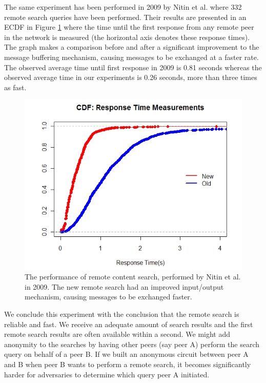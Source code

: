 \noindent The same experiment has been performed in 2009 by Nitin et al. where 332 remote search queries have been performed. Their results are presented in an ECDF in Figure \ref{fig:nitin_remote_search} where the time until the first response from any remote peer in the network is measured (the horizontal axis denotes these response times). The graph makes a comparison before and after a significant improvement to the message buffering mechanism, causing messages to be exchanged at a faster rate. The observed average time until first response in 2009 is 0.81 seconds whereas the observed average time in our experiments is 0.26 seconds, more than three times as fast.\\

\begin{figure}[!h]
	\centering
	\includegraphics[width=0.7\columnwidth]{images/experiments/nitin_remote_search}
	\caption{The performance of remote content search, performed by Nitin et al. in 2009. The new remote search had an improved input/output mechanism, causing messages to be exchanged faster.}
	\label{fig:nitin_remote_search}
\end{figure}

\noindent We conclude this experiment with the conclusion that the remote search is reliable and fast. We receive an adequate amount of search results and the first remote search results are often available within a second. We might add anonymity to the searches by having other peers (say peer A) perform the search query on behalf of a peer B. If we built an anonymous circuit between peer A and B when peer B wants to perform a remote search, it becomes significantly harder for adversaries to determine which query peer A initiated.

